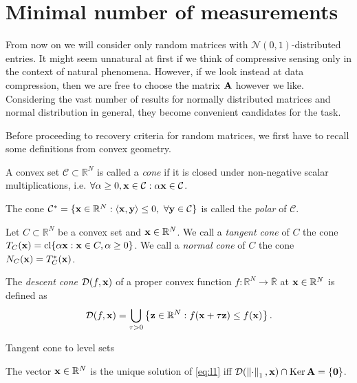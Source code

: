 \section{Minimal number of measurements}

From now on we will consider only random matrices with $\mathcal{N}(0,1)$-distributed entries.
It might seem unnatural at first if we think of compressive sensing only in the context of natural phenomena.
However, if we look instead at data compression, then we are free to choose the matrix $\mathbf{A}$ however we like.
Considering the vast number of results for normally distributed matrices and normal distribution in general,
they become convenient candidates for the task.

Before proceeding to recovery criteria for random matrices, we first have to recall some definitions from convex geometry.

\begin{definition}
    A convex set $\mathcal{C} \subset \mathbb{R}^N$ is called a \textit{cone} if it is closed under non-negative scalar multiplications, i.e.
    $\forall \alpha \geq 0, \mathbf{x} \in \mathcal{C}: \alpha \mathbf{x} \in \mathcal{C}$.

    The cone $\mathcal{C}^* = \{ \mathbf{x} \in \mathbb{R}^N : \left< \mathbf{x}, \mathbf{y} \right> \leq 0, \ \forall \mathbf{y} \in \mathcal{C} \}$
    is called the \textit{polar} of $\mathcal{C}$.
\end{definition}

\begin{definition}
    Let $C \subset \mathbb{R}^N$ be a convex set and $\mathbf{x} \in \mathbb{R}^N$.
    We call a \textit{tangent cone} of $C$ the cone $T_C(\mathbf{x}) = \operatorname{cl}\{\alpha\mathbf{x}: \mathbf{x} \in C, \alpha \geq 0  \} $.
    We call a \textit{normal cone} of $C$ the cone $N_C(\mathbf{x}) = T_C^*(\mathbf{x})$.
\end{definition}

\begin{definition}
    The \textit{descent cone} $\mathcal{D}(f, \mathbf{x}) $ of a proper convex function $f: \mathbb{R}^N \rightarrow \overline{\mathbb{R}}$
    at $\mathbf{x} \in \mathbb{R}^N$ is defined as $$\mathcal{D}(f, \mathbf{x}) = \bigcup_{\tau > 0} \left\{ \mathbf{z} \in \mathbb{R}^N: f(\mathbf{x}+\tau \mathbf{z}) \leq f(\mathbf{x}) \right\}. $$
\end{definition}

\begin{remark}
    Tangent cone to level sets
\end{remark}

\begin{proposition}
    The vector $\mathbf{x} \in \mathbb{R}^N$ is the unique solution of \ref{eq:l1} iff $\mathcal{D}(\left\Vert\cdot\right\Vert_1, \mathbf{x}) \cap \operatorname{Ker} \mathbf{A} = \{\mathbf{0}\}$.
    \label{th:ker}
\end{proposition}

